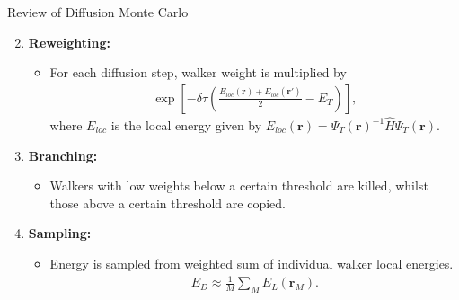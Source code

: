 \documentclass{beamer}
\begin{document}
\begin{frame}{Review of Diffusion Monte Carlo}
  \begin{enumerate}
  \setcounter{enumi}{1}
    \item \textbf{Reweighting:} 
      \begin{itemize}
      \item For each diffusion step, walker weight is multiplied by
    \small{\begin{align}
    \label{ReweightWalker}
 \exp \left[ -\delta \tau \left( \frac{ E_{loc}(\mathbf{r}) + E_{loc}(\mathbf{r}') }{2} - E_T \right) \right], 
    \end{align}}%
    where $E_{loc}$ is the local energy given by $ E_{loc}(\mathbf{r}) = \Psi_T (\mathbf{r})^{-1} \hat H \Psi_T (\mathbf{r})$.%
     \end{itemize}
     \item{\textbf{Branching:}
     \begin{itemize}
       \item Walkers with low weights below a certain threshold are killed, whilst those above a certain threshold are copied.
     \end{itemize}
     }
  \item \textbf{Sampling:} 
   \begin{itemize}
       \item Energy is sampled from weighted sum of individual walker local energies.
       \small{\begin{align}
       \label{LocalEnergySampling}
 E_{D} \approx \frac{1}{M} \sum_M E_L (\mathbf{r}_M).
    \end{align}}%
     \end{itemize}
  \end{enumerate}
\end{frame}
\end{document}
